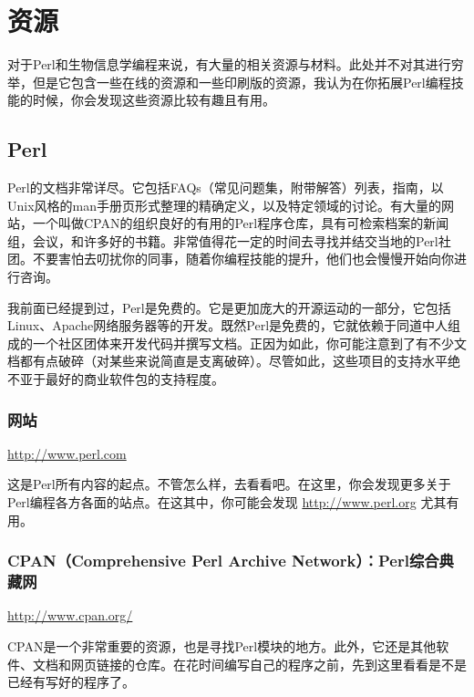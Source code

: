 \chapter{资源}
\label{chap:chapteraa}
\minitoc

对于Perl和生物信息学编程来说，有大量的相关资源与材料。此处并不对其进行穷举，但是它包含一些在线的资源和一些印刷版的资源，我认为在你拓展Perl编程技能的时候，你会发现这些资源比较有趣且有用。

\section{Perl}
Perl的文档非常详尽。它包括FAQs（常见问题集，附带解答）列表，指南，以Unix风格的man手册页形式整理的精确定义，以及特定领域的讨论。有大量的网站，一个叫做CPAN的组织良好的有用的Perl程序仓库，具有可检索档案的新闻组，会议，和许多好的书籍。非常值得花一定的时间去寻找并结交当地的Perl社团。不要害怕去叨扰你的同事，随着你编程技能的提升，他们也会慢慢开始向你进行咨询。

我前面已经提到过，Perl是免费的。它是更加庞大的开源运动的一部分，它包括Linux、Apache网络服务器等的开发。既然Perl是免费的，它就依赖于同道中人组成的一个社区团体来开发代码并撰写文档。正因为如此，你可能注意到了有不少文档都有点破碎（对某些来说简直是支离破碎）。尽管如此，这些项目的支持水平绝不亚于最好的商业软件包的支持程度。

\subsection{网站}
\href{http://www.perl.com}{http://www.perl.com}

\begin{adjustwidth}{4em}{}
这是Perl所有内容的起点。不管怎么样，去看看吧。在这里，你会发现更多关于Perl编程各方各面的站点。在这其中，你可能会发现 \href{http://www.perl.org}{http://www.perl.org} 尤其有用。
\end{adjustwidth}

\subsection{CPAN（Comprehensive Perl Archive Network）：Perl综合典藏网}
\href{http://www.cpan.org/}{http://www.cpan.org/}

\begin{adjustwidth}{4em}{}
CPAN是一个非常重要的资源，也是寻找Perl模块的地方。此外，它还是其他软件、文档和网页链接的仓库。在花时间编写自己的程序之前，先到这里看看是不是已经有写好的程序了。
\end{adjustwidth}

